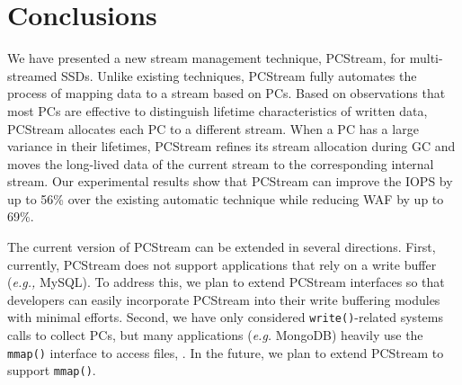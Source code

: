 \vspace{-10pt}
\section{Conclusions}
\vspace{-5pt}

We have presented a new stream management technique, \textsf{\small PCStream},
for multi-streamed SSDs.  Unlike existing techniques, \textsf{\small PCStream}
fully automates the process of mapping data to a stream based on PCs.  Based on
observations that most PCs are effective to distinguish lifetime
characteristics of written data, \textsf{\small PCStream} allocates each PC to
a different stream.  When a PC has a large variance in their lifetimes,
\textsf{\small PCStream} refines its stream allocation during GC and moves the
long-lived data of the current stream to the corresponding internal stream.
Our experimental results show that \textsf{\small PCStream} can improve the
IOPS by up to 56\% over the existing automatic technique while reducing WAF by
up to 69\%. 

The current version of \textsf{\small PCStream} can be extended in several
directions.  First, currently, PCStream does not support applications that rely
on a write buffer ({\it e.g.,} MySQL). To address this, we plan to extend
PCStream interfaces so that developers can easily incorporate PCStream into
their write buffering modules with minimal efforts.  Second, we have only
considered \texttt{write()}-related systems calls to collect PCs, but many
applications ({\it e.g.} MongoDB) heavily use the \texttt{mmap()} interface to
access files, . In the future, we plan to extend PCStream to support
\texttt{mmap()}.
